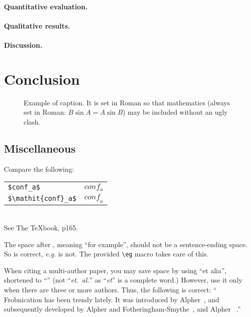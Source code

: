 \documentclass[10pt,twocolumn,letterpaper]{article}
\begin{document}
\paragraph{Quantitative evaluation.}

\paragraph{Qualitative results.}

\paragraph{Discussion.}


\section{Conclusion}



\begin{figure}[t]
\begin{center}
\fbox{\rule{0pt}{2in} \rule{0.9\linewidth}{0pt}}
\end{center}
   \caption{Example of caption.  It is set in Roman so that mathematics
   (always set in Roman: $B \sin A = A \sin B$) may be included without an
   ugly clash.}
\label{fig:long}
\label{fig:onecol}
\end{figure}

\subsection{Miscellaneous}

\noindent
Compare the following:\\
\begin{tabular}{ll}
 \verb'$conf_a$' &  $conf_a$ \\
 \verb'$\mathit{conf}_a$' & $\mathit{conf}_a$
\end{tabular}\\
See The \TeX book, p165.

The space after \eg, meaning ``for example'', should not be a
sentence-ending space. So \eg is correct, {\em e.g.} is not.  The provided
\verb'\eg' macro takes care of this.

When citing a multi-author paper, you may save space by using ``et alia'',
shortened to ``\etal'' (not ``{\em et.\ al.}'' as ``{\em et}'' is a complete word.)
However, use it only when there are three or more authors.  Thus, the
following is correct: ``
   Frobnication has been trendy lately.
   It was introduced by Alpher~\cite{Alpher02}, and subsequently developed by
   Alpher and Fotheringham-Smythe~\cite{Alpher03}, and Alpher \etal~\cite{Alpher04}.''
\end{document}
